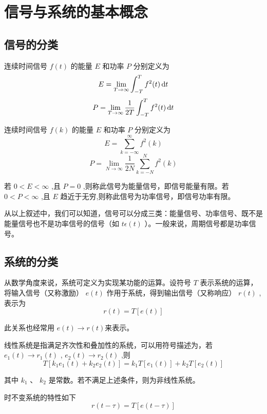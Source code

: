 \documentclass[UTF8,a4paper,11pt]{article}
\begin{document}
\section{信号与系统的基本概念}
\subsection{信号的分类}
连续时间信号 $f(t)$ 的能量 $E$ 和功率 $P$ 分别定义为
\begin{equation}
E=\lim_{T \to \infty}\int_{-T}^{T} {f^2(t)} \,{\rm d}t
\end{equation}
\begin{equation}
P=\lim_{T \to \infty}\frac{1}{2T}\int_{-T}^{T} {f^2(t)} \,{\rm d}t 
\end{equation}

连续时间信号 $f(k)$ 的能量 $E$ 和功率 $P$ 分别定义为
\begin{equation}
E=\sum_{k=-\infty}^\infty f^2(k)
\end{equation}
\begin{equation}
P=\lim_{N \to \infty}\frac{1}{2N}\sum_{k=-N}^N f^2(k)
\end{equation}

若 $0<E<\infty$ ,且 $P=0$ ,则称此信号为能量信号，即信号能量有限。若 $0<P<\infty$ ,且 $E$ 趋近于无穷,则称此信号为功率信号，即信号功率有限。

从以上叙述中，我们可以知道，信号可以分成三类：能量信号、功率信号、既不是能量信号也不是功率信号的信号（如 $t\epsilon(t)$ ）。一般来说，周期信号都是功率信号。

\subsection{系统的分类}
从数学角度来说，系统可定义为实现某功能的运算。设符号 $T$ 表示系统的运算，将输入信号（又称激励） $e(t)$ 作用于系统，得到输出信号（又称响应） $r(t)$ ,表示为
\begin{equation}
r(t)=T[e(t)] 
\end{equation}

此关系也经常用 $e(t)\to r(t)$来表示。

线性系统是指满足齐次性和叠加性的系统，可以用符号描述为，若 $e_1(t)\to r_1(t)$ , $e_2(t)\to r_2(t)$ ,则
\begin{equation}
T[k_1e_1(t)+k_2e_2(t)]=k_1T[e_1(t)]+k_2T[e_2(t)] 
\end{equation}

其中 $k_1$ 、 $k_2$ 是常数。若不满足上述条件，则为非线性系统。

时不变系统的特性如下
\begin{equation}
r(t-\tau)=T[e(t-\tau)]
\end{equation}
\end{document}
